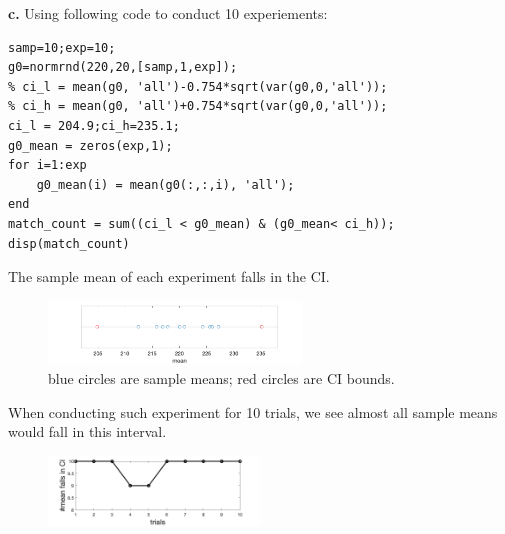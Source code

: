 \documentclass[12pt,a4paper]{article}
\begin{document}
\noindent\textbf{c.} 
Using following code to conduct 10 experiements:
\begin{lstlisting}
samp=10;exp=10;
g0=normrnd(220,20,[samp,1,exp]);
% ci_l = mean(g0, 'all')-0.754*sqrt(var(g0,0,'all'));
% ci_h = mean(g0, 'all')+0.754*sqrt(var(g0,0,'all'));
ci_l = 204.9;ci_h=235.1;
g0_mean = zeros(exp,1);
for i=1:exp
    g0_mean(i) = mean(g0(:,:,i), 'all');
end
match_count = sum((ci_l < g0_mean) & (g0_mean< ci_h));
disp(match_count)
\end{lstlisting}
The sample mean of each experiment falls in the CI.
\begin{figure}[!ht]
    \centering
    \includegraphics*[width=0.6\textwidth]{hw_8_5_ci.png}
    \caption{blue circles are sample means; red circles are CI bounds.}
\end{figure}

When conducting such experiment for 10 trials, we see almost all sample means would fall in this interval. 
\begin{figure}[!ht]
\centering
\includegraphics[width=0.5\textwidth]{hw_8_5.png}
\end{figure}
\end{document}
